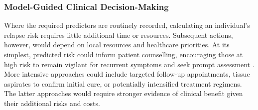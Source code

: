 \subsubsection{Model-Guided Clinical Decision-Making}

Where the required predictors are routinely recorded, calculating an individual's relapse risk requires little additional time or resources. Subsequent actions, however, would depend on local resources and healthcare priorities. At its simplest, predicted risk could inform patient counselling, encouraging those at high risk to remain vigilant for recurrent symptoms and seek prompt assessment . More intensive approaches could include targeted follow-up appointments, tissue aspirates to confirm initial cure, or potentially intensified treatment regimens. The latter approaches would  require stronger evidence of clinical benefit given their additional risks and costs.

